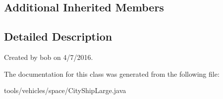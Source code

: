 \subsection*{Additional Inherited Members}


\subsection{Detailed Description}
Created by bob on 4/7/2016. 

The documentation for this class was generated from the following file\+:\begin{DoxyCompactItemize}
\item 
tools/vehicles/space/City\+Ship\+Large.\+java\end{DoxyCompactItemize}
